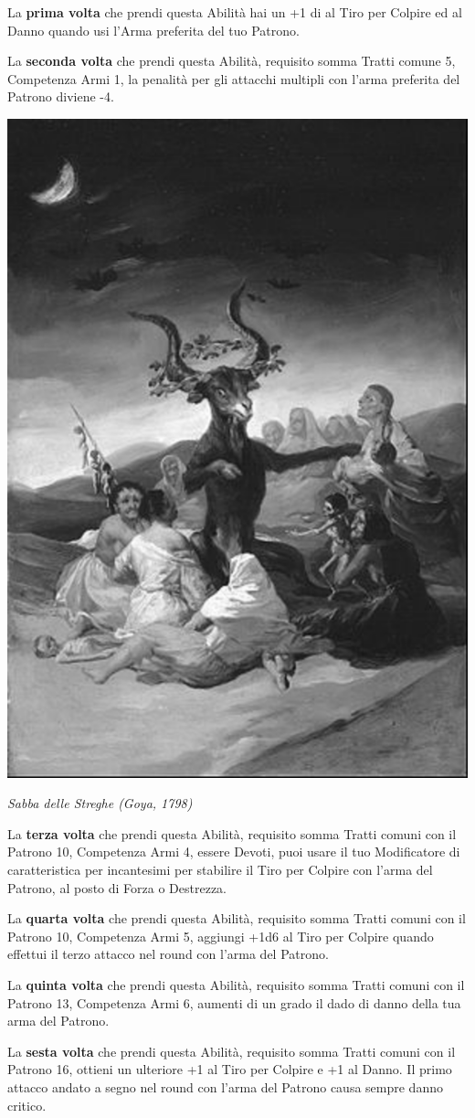 \begin{multicols}{2}
La \textbf{prima volta} che prendi questa Abilità hai un +1 di al Tiro per Colpire ed al Danno quando usi l'Arma preferita del tuo Patrono.

La \textbf{seconda volta} che prendi questa Abilità, requisito somma Tratti comune 5, Competenza Armi 1, la penalità per gli attacchi multipli con l'arma preferita del Patrono diviene -4.

\begin{center}
	\includegraphics[width=0.56\linewidth]{immagini/streghegoya.png}

	\emph{Sabba delle Streghe (Goya, 1798)}
\end{center}

La \textbf{terza volta} che prendi questa Abilità, requisito somma Tratti comuni con il Patrono 10, Competenza Armi 4, essere Devoti, puoi usare il tuo Modificatore di caratteristica per incantesimi per stabilire il Tiro per Colpire con l'arma del Patrono, al posto di Forza o Destrezza.

La \textbf{quarta volta} che prendi questa Abilità, requisito somma Tratti comuni con il Patrono 10, Competenza Armi 5, aggiungi +1d6 al Tiro per Colpire quando effettui il terzo attacco nel round con l'arma del Patrono.

La \textbf{quinta volta} che prendi questa Abilità, requisito somma Tratti comuni con il Patrono 13, Competenza Armi 6, aumenti di un grado il dado di danno della tua arma del Patrono.

La \textbf{sesta volta} che prendi questa Abilità, requisito somma Tratti comuni con il Patrono 16, ottieni un ulteriore +1 al Tiro per Colpire e +1 al Danno. Il primo attacco andato a segno nel round con l'arma del Patrono causa sempre danno critico.


\end{multicols}

